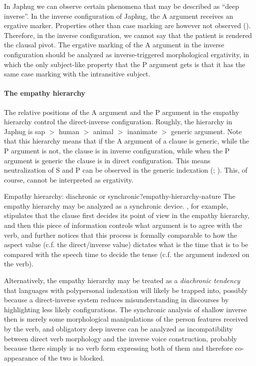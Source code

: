 \documentclass[a4paper, oneside, 12pt]{report}
\newcommand*{\textgt}{$>$ }
\newcommand*{\citesec}[1]{\S~{#1}}
\begin{document}
In Japhug we can observe certain phenomena that may be described as ``deep inverse''.
In the inverse configuration of Japhug, 
the A argument receives an ergative marker.
Properties other than case marking are however not observed
().
Therefore, in the inverse configuration, we cannot say that
the patient is rendered the clausal pivot.
The ergative marking of the A argument in the inverse configuration should be analyzed as
inverse-triggered morphological ergativity,
in which the only subject-like property that the P argument gets
is that it has the same case marking with the intransitive subject. 

\paragraph*{The empathy hierarchy}\label{sec:grammatical.clause.direct-inverse.hierarchy} 
The relative positions of the A argument and the P argument in the empathy hierarchy
control the direct-inverse configuration.
Roughly, the hierarchy in Japhug is 
\ac{sap} \textgt human \textgt animal \textgt inanimate \textgt generic argument.
Note that this hierarchy means that
if the A argument of a clause is generic,
while the P argument is not,
the clause is in inverse configuration,
while when the P argument is generic the clause is in direct configuration.
This means neutralization of S and P can be observed in the generic indexation
(\citealt{jacques2012argument}; \citealt[\citesec{14.3.2.5}]{jacques2021grammar}).
This, of course, cannot be interpreted as ergativity.

\begin{todobox}{Empathy hierarchy: diachronic or synchronic?}{empathy-hierarchy-nature}
    The empathy hierarchy may be analyzed as a synchronic device. 
    \citet[\citesec{7.4}]{wiltschko2014universal}, for example,
    stipulates that the clause first decides its point of view in the empathy hierarchy,
    and then this piece of information controls what argument is to agree with the verb,
    and further notices that this process is formally comparable to
    how the aspect value (c.f. the direct/inverse value) 
    dictates what is the time that is to be compared with the speech time to decide the tense
    (c.f. the argument indexed on the verb).
    
    Alternatively, the empathy hierarchy may be treated as a \emph{diachronic tendency}
    that languages with polypersonal indexation will likely be trapped into,
    possibly because a direct-inverse system reduces misunderstanding in discourses
    by highlighting less likely configurations.
    The synchronic analysis of shallow inverse then is merely 
    some morphological manipulations of the person features received by the verb,
    and obligatory deep inverse can be analyzed as incompatibility between
    direct verb morphology and the inverse voice construction,
    probably because there simply is no verb form expressing both of them
    and therefore co-appearance of the two is blocked.
\end{todobox}
\end{document}
